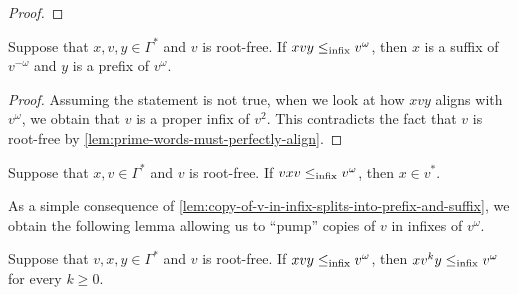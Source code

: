 \begin{proof}
\end{proof}

\begin{lemma}\label{lem:copy-of-v-in-infix-splits-into-prefix-and-suffix}
    Suppose that $x,v,y \in \Gamma^*$ and $v$ is root-free. If $x v y \leq_{\mathrm{infix}} v^\omega$, then $x$ is a suffix of $v^{-\omega}$ and $y$ is a prefix of $v^\omega$.
\end{lemma}

\begin{proof}
    Assuming the statement is not true, when we look at how $x v y$ aligns with $v^\omega$, we obtain that $v$ is a proper infix of $v^2$. This contradicts the fact that $v$ is root-free by \cref{lem:prime-words-must-perfectly-align}.
\end{proof}

\begin{lemma}\label{lem:between-two-copies-of-v-it-must-be-power-of-v}
    Suppose that $x, v \in \Gamma^*$ and $v$ is root-free. If $v x v \leq_{\mathrm{infix}} v^\omega$, then $x \in v^*$.
\end{lemma}

As a simple consequence of \cref{lem:copy-of-v-in-infix-splits-into-prefix-and-suffix}, we obtain the following lemma allowing us to ``pump'' copies of $v$ in infixes of $v^\omega$.

\begin{lemma}\label{lem:copies-of-v-can-be-pumped}
    Suppose that $v,x,y \in \Gamma^*$ and $v$ is root-free. If $x v y \leq_{\mathrm{infix}} v^\omega$, then $x v^k y \leq_{\mathrm{infix}} v^\omega$ for every $k \geq 0$.
\end{lemma}
